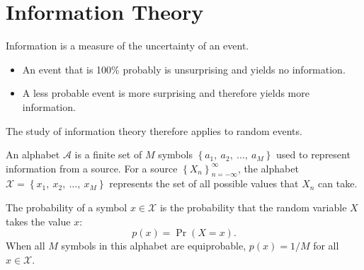 \documentclass{article}
\begin{document}
\section{Information Theory}
Information is a measure of the uncertainty of an event.
\begin{itemize}
    \item An event that is 100\% probably is unsurprising and yields no
          information.
    \item A less probable event is more surprising and therefore yields
          more information.
\end{itemize}
The study of information theory therefore applies to random events.
\begin{definition}[Alphabet]
    An alphabet \(\mathcal{A}\) is a finite set of \(M\) symbols
    \(\left\{ a_1,\: a_2,\: \dots,\: a_M \right\}\) used to represent
    information from a source.
    For a source \(\left\{ X_n \right\}_{n=-\infty}^{\infty}\),
    the alphabet \(\mathcal{X} = \left\{ x_1,\: x_2,\: \ldots,\: x_M \right\}\)
    represents the set of all possible values that \(X_n\) can take.
\end{definition}
\begin{definition}
    The probability of a symbol \(x \in \mathcal{X}\) is the
    probability that the random variable \(X\) takes the value \(x\):
    \begin{equation*}
        p\left( x \right) = \Pr{\left( X = x \right)}.
    \end{equation*}
    When all \(M\) symbols in this alphabet are equiprobable,
    \(p\left( x \right) = 1/M\) for all \(x \in \mathcal{X}\).
\end{definition}
\end{document}
